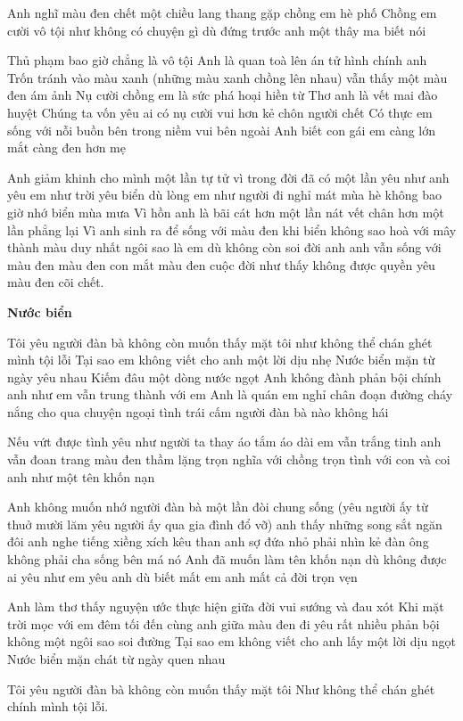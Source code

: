 \documentclass[../main.tex]{subfiles}
\begin{document}
\begin{multicols}{2}
Anh nghĩ màu đen chết 
một chiều lang thang gặp chồng em hè phố 
Chồng em cười vô tội 
như không có chuyện gì 
dù đứng trước anh một thây ma biết nói 
 
Thủ phạm bao giờ chẳng là vô tội 
Anh là quan toà lên án tử hình chính anh 
Trốn tránh vào màu xanh 
(những màu xanh chồng lên nhau) 
vẫn thấy một màu đen ám ảnh 
Nụ cười chồng em là sức phá hoại hiền từ 
Thơ anh là vết mai đào huyệt 
Chúng ta vốn yêu ai có nụ cười vui hơn kẻ chôn người chết 
Có thực em sống với nỗi buồn bên trong niềm vui bên ngoài 
Anh biết con gái em càng lớn mắt càng đen hơn mẹ 
 
Anh giảm khinh cho mình một lần tự tử 
vì trong đời đã có một lần yêu 
như anh yêu em 
như trời yêu biển 
dù lòng em như người đi nghỉ mát mùa hè 
không bao giờ nhớ biển mùa mưa 
Vì hồn anh là bãi cát 
hơn một lần nát vết chân 
hơn một lần phẳng lại 
Vì anh sinh ra để sống với màu đen 
khi biển không sao hoà với mây thành màu duy nhất 
ngôi sao là em dù không còn soi đời anh 
anh vẫn sống với màu đen 
màu đen con mắt 
màu đen cuộc đời 
như thấy không được quyền yêu màu đen cõi chết. 
 
 
\textbf{Nước biển} 
 
Tôi yêu người đàn bà không còn muốn thấy mặt tôi 
như không thể chán ghét mình tội lỗi 
Tại sao em không viết cho anh một lời dịu nhẹ 
Nước biển mặn từ ngày yêu nhau 
Kiếm đâu một dòng nước ngọt 
Anh không đành phản bội chính anh 
như em vẫn trung thành với em 
Anh là quán em nghỉ chân đoạn đường cháy nắng 
cho qua chuyện ngoại tình 
trái cấm người đàn bà nào không hái 
 
Nếu vứt được tình yêu như người ta thay áo tắm 
áo dài em vẫn trắng tinh anh 
vẫn đoan trang màu đen thầm lặng 
trọn nghĩa với chồng 
trọn tình với con 
và coi anh như một tên khốn nạn 
 
Anh không muốn nhớ 
người đàn bà một lần đòi chung sống 
(yêu người ấy từ thuở mười lăm 
yêu người ấy qua gia đình đổ vỡ) 
anh thấy những song sắt ngăn đôi 
anh nghe tiếng xiềng xích kêu than 
anh sợ đứa nhỏ phải nhìn kẻ đàn ông không phải cha sống bên má nó 
Anh đã muốn làm tên khốn nạn 
dù không được ai yêu như em yêu anh 
dù biết mất em anh mất cả đời trọn vẹn 
 
Anh làm thơ thấy nguyện ước thực hiện giữa đời 
vui sướng và đau xót 
Khi mặt trời mọc với em 
đêm tối đến cùng anh 
giữa màu đen đi yêu rất nhiều phản bội  
không một ngôi sao soi đường 
Tại sao em không viết cho anh lấy một lời dịu ngọt 
Nước biển mặn chát từ ngày quen nhau 
 
Tôi yêu người đàn bà không còn muốn thấy mặt tôi 
Như không thể chán ghét chính mình tội lỗi. 
\end{multicols}
\end{document}

